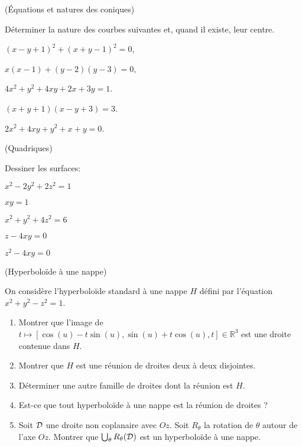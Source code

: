 \documentclass[a4paper,12pt,reqno]{amsart}
\begin{document}
\begin{exo} (Équations et natures des coniques)

  Déterminer la nature des courbes suivantes et, quand il existe, leur centre.
  \begin{examplescol}{2}
    \item $(x-y+1)^2+(x+y-1)^2=0$,
    \item $x(x-1)+(y-2)(y-3)=0$,
    \item $4x^{2}+y^{2}+4xy+2x+3y=1$.
    \item $(x+y+1)(x-y+3)=3$.
    \item $2x^{2}+4xy+y^{2}+x+y=0$.
  \end{examplescol}

\end{exo}


\begin{exo} (Quadriques)

  Dessiner les surfaces:
  \begin{examplescol}{2}
    \item $x^2-2y^2+2z^2=1$
    \item $xy=1$
    \item $x^2+y^2+4z^2=6$
    \item $z-4xy=0$
    \item $z^2-4xy=0$
  \end{examplescol}

\end{exo}


\begin{exo} (Hyperboloïde à une nappe)

  On considère l'hyperboloïde standard à une nappe $H$ défini par l'équation $x^{2}+y^{2}-z^{2}=1$.
  \begin{enumerate}
    \item Montrer que l'image de $t\mapsto[\cos(u)-t\sin(u),\sin(u)+t\cos(u),t]\in \mathbb{R}^{3}$ est une droite contenue dans $H$.
    \item Montrer que $H$ est une réunion de droites deux à deux disjointes.
    \item Déterminer une autre famille de droites dont la réunion est $H$.
    \item Est-ce que tout hyperboloïde à une nappe est la réunion de droites ?
    \item Soit $\mathcal{D}$ une droite non coplanaire avec $Oz$. Soit $R_{\theta}$ la rotation de $\theta$ autour de l'axe $Oz$. Montrer que $\bigcup_{\theta}R_{\theta}(\mathcal{D})$ est un hyperboloïde à une nappe.
  \end{enumerate}

\end{exo}
\end{document}
